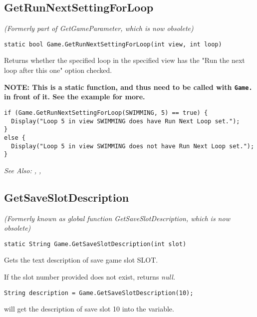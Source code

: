 \subsection{GetRunNextSettingForLoop}\label{Game.GetRunNextSettingForLoop}%

\it{(Formerly part of GetGameParameter, which is now obsolete)}

\begin{verbatim}
static bool Game.GetRunNextSettingForLoop(int view, int loop)
\end{verbatim}
Returns whether the specified loop in the specified view has the "Run the next loop after this one" option checked.

\bf{NOTE:} This is a static function, and thus need to be called with \verb$Game.$ in front of it. See
the example for more.

\begin{verbatim}
if (Game.GetRunNextSettingForLoop(SWIMMING, 5) == true) {
  Display("Loop 5 in view SWIMMING does have Run Next Loop set.");
}
else {
  Display("Loop 5 in view SWIMMING does not have Run Next Loop set.");
}
\end{verbatim}

\it{See Also:} ,
,


\subsection{GetSaveSlotDescription}\label{Game.GetSaveSlotDescription}%

\it{(Formerly known as global function GetSaveSlotDescription, which is now obsolete)}

\begin{verbatim}
static String Game.GetSaveSlotDescription(int slot)
\end{verbatim}
Gets the text description of save game slot SLOT.

If the slot number provided does not exist, returns \it{null}.

\begin{verbatim}
String description = Game.GetSaveSlotDescription(10);
\end{verbatim}
will get the description of save slot 10 into the variable.


